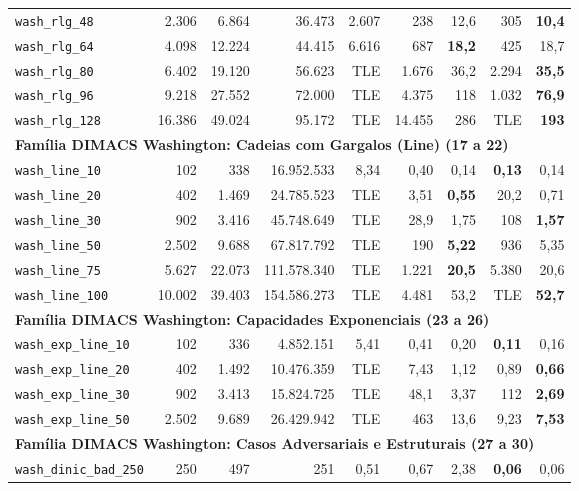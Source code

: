 \begin{longtable}{lrrrrrrrr}
\texttt{wash\_rlg\_48} & 2.306 & 6.864 & 36.473 & 2.607 & 238 & 12,6 & 305 & \textbf{10,4} \\
\texttt{wash\_rlg\_64} & 4.098 & 12.224 & 44.415 & 6.616 & 687 & \textbf{18,2} & 425 & 18,7 \\
\texttt{wash\_rlg\_80} & 6.402 & 19.120 & 56.623 & TLE & 1.676 & 36,2 & 2.294 & \textbf{35,5} \\
\texttt{wash\_rlg\_96} & 9.218 & 27.552 & 72.000 & TLE & 4.375 & 118 & 1.032 & \textbf{76,9} \\
\texttt{wash\_rlg\_128} & 16.386 & 49.024 & 95.172 & TLE & 14.455 & 286 & TLE & \textbf{193} \\
\midrule
\multicolumn{9}{l}{\textbf{Família DIMACS Washington: Cadeias com Gargalos (Line) (17 a 22)}} \\
\midrule
\texttt{wash\_line\_10} & 102 & 338 & 16.952.533 & 8,34 & 0,40 & 0,14 & \textbf{0,13} & 0,14 \\
\texttt{wash\_line\_20} & 402 & 1.469 & 24.785.523 & TLE & 3,51 & \textbf{0,55} & 20,2 & 0,71 \\
\texttt{wash\_line\_30} & 902 & 3.416 & 45.748.649 & TLE & 28,9 & 1,75 & 108 & \textbf{1,57} \\
\texttt{wash\_line\_50} & 2.502 & 9.688 & 67.817.792 & TLE & 190 & \textbf{5,22} & 936 & 5,35 \\
\texttt{wash\_line\_75} & 5.627 & 22.073 & 111.578.340 & TLE & 1.221 & \textbf{20,5} & 5.380 & 20,6 \\
\texttt{wash\_line\_100} & 10.002 & 39.403 & 154.586.273 & TLE & 4.481 & 53,2 & TLE & \textbf{52,7} \\
\midrule
\multicolumn{9}{l}{\textbf{Família DIMACS Washington: Capacidades Exponenciais (23 a 26)}} \\
\midrule
\texttt{wash\_exp\_line\_10} & 102 & 336 & 4.852.151 & 5,41 & 0,41 & 0,20 & \textbf{0,11} & 0,16 \\
\texttt{wash\_exp\_line\_20} & 402 & 1.492 & 10.476.359 & TLE & 7,43 & 1,12 & 0,89 & \textbf{0,66} \\
\texttt{wash\_exp\_line\_30} & 902 & 3.413 & 15.824.725 & TLE & 48,1 & 3,37 & 112 & \textbf{2,69} \\
\texttt{wash\_exp\_line\_50} & 2.502 & 9.689 & 26.429.942 & TLE & 463 & 13,6 & 9,23 & \textbf{7,53} \\
\midrule
\multicolumn{9}{l}{\textbf{Família DIMACS Washington: Casos Adversariais e Estruturais (27 a 30)}} \\
\midrule
\texttt{wash\_dinic\_bad\_250} & 250 & 497 & 251 & 0,51 & 0,67 & 2,38 & \textbf{0,06} & 0,06 \\

\end{longtable}

